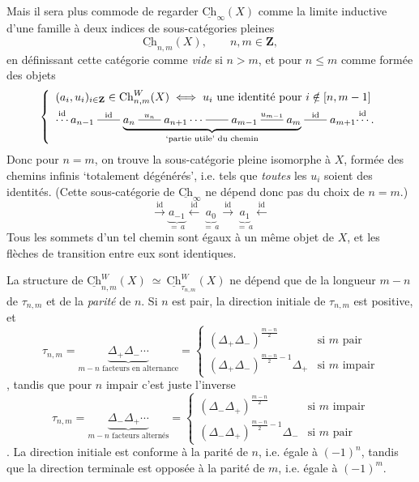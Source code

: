 \documentclass[11pt]{article}
\newcommand{\printedpage}[1]{\marginpar{\footnotesize p.~#1}}
\newcommand{\msp}[1]{\marginpar{\footnotesize [#1]}}
\newcommand{\Ch}{\underline{\mathrm{Ch}}}
\newcommand{\dashto}[1]{\mathrel{\overset{#1}{\rule[0.6ex]{2em}{0.4pt}}}}
\begin{document}
Mais il sera plus commode de regarder $\Ch_{\infty}(X)$ comme la limite inductive d'une
\msp{page 146}
famille à deux indices de sous-catégories pleines
\[
\Ch_{n,m}(X), \qquad n, m \in \mathbf{Z},
\]
en définissant cette catégorie comme \textit{vide} si $n > m$, et pour $n \leq m$ comme formée des objets
\[
\left\{ \begin{array}{l}
(a_i, u_i)_{i \in \mathbf{Z}} \in \mathrm{Ch}^{W}_{n,m}(X) \iff u_i \text{ une identité pour } i \notin [n, m-1] \\[1ex]
\overset{\mathrm{id}}{\cdots}\, a_{n-1} \dashto{\mathrm{id}} \underbrace{a_n \dashto{u_n} a_{n+1} \cdots \dashto{} a_{m-1} \dashto{u_{m-1}} a_m}_{\text{\scriptsize `partie utile' du chemin}} \dashto{\mathrm{id}} a_{m+1} \overset{\mathrm{id}}{\cdots}\,.
\end{array} \right.
\]
Donc pour $n = m$, on trouve la sous-catégorie pleine isomorphe à $X$, formée des chemins infinis `totalement dégénérés', i.e. tels que \textit{toutes} les $u_i$ soient des identités. (Cette sous-catégorie de $\Ch_{\infty}$ ne dépend donc pas du choix de $n = m$.)
\[
\xrightarrow{\mathrm{id}} \underbrace{a_{-1}}_{=\, a} \xleftarrow{\mathrm{id}} \underbrace{a_0}_{=\, a} \xrightarrow{\mathrm{id}} \underbrace{a_1}_{=\, a} \xleftarrow{\mathrm{id}}
\]
Tous les sommets d'un tel chemin sont égaux à un même objet de $X$, et les flèches de transition entre eux sont identiques.

La structure de $\Ch^{W}_{n,m}(X) \ \simeq \ \Ch^{W}_{\tau_{n,m}}(X)$ ne dépend que de la longueur $m-n$ de $\tau_{n,m}$ et de la \textit{parité} de $n$. Si $n$ est pair, la direction initiale de $\tau_{n,m}$ est positive, et
\[
\tau_{n,m} = \underbrace{\Delta_+ \Delta_- \cdots}_{m-n \text{ facteurs en alternance}} = \left\{ \begin{array}{ll}
(\Delta_+ \Delta_-)^{\frac{m-n}{2}} & \text{si } m \text{ pair} \\[1ex]
(\Delta_+ \Delta_-)^{\frac{m-n}{2}-1} \Delta_+ & \text{si } m \text{ impair}
\end{array} \right.
\]
, tandis que pour $n$ impair c'est juste l'inverse
\printedpage{92}
\msp{page 147}
\[
\tau_{n,m} = \underbrace{\Delta_- \Delta_+ \cdots}_{m-n \text{ facteurs alternés}} = \left\{ \begin{array}{ll}
(\Delta_- \Delta_+)^{\frac{m-n}{2}} & \text{si } m \text{ impair} \\[1ex]
(\Delta_- \Delta_+)^{\frac{m-n}{2}-1} \Delta_- & \text{si } m \text{ pair}
\end{array} \right.
\]
. La direction initiale est conforme à la parité de $n$, i.e. égale à $(-1)^n$, tandis que la direction terminale est opposée à la parité de $m$, i.e. égale à $(-1)^m$.
\end{document}

